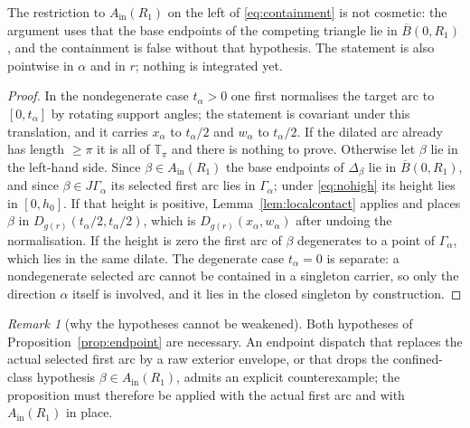 \documentclass[11pt]{article}
\theoremstyle{plain}
\theoremstyle{definition}
\theoremstyle{remark}
\newtheorem{remark}[theorem]{Remark}
\newcommand{\Tp}{\mathbb{T}_{\pi}}
\newcommand{\Ain}{A_{\mathrm{in}}}
\begin{document}
The restriction to $\Ain(R_{1})$ on the left of \eqref{eq:containment} is not
cosmetic: the argument uses that the base endpoints of the competing triangle lie
in $\overline B(0,R_{1})$, and the containment is false without that hypothesis.
The statement is also pointwise in $\alpha$ and in $r$; nothing is integrated
yet.

\begin{proof}
In the nondegenerate case $t_{\alpha}>0$ one first normalises the target arc to
$[0,t_{\alpha}]$ by rotating support angles; the statement is covariant under
this translation, and it carries $x_{\alpha}$ to $t_{\alpha}/2$ and
$w_{\alpha}$ to $t_{\alpha}/2$. If the dilated arc already has length $\ge\pi$
it is all of $\Tp$ and there is nothing to prove. Otherwise let $\beta$ lie in
the left-hand side. Since $\beta\in\Ain(R_{1})$ the base endpoints of
$\Delta_{\beta}$ lie in $\overline B(0,R_{1})$, and since
$\beta\in J\Gamma_{\alpha}$ its selected first arc lies in $\Gamma_{\alpha}$;
under \eqref{eq:nohigh} its height lies in $[0,h_{0}]$. If that height is
positive, Lemma~\ref{lem:localcontact} applies and places $\beta$ in
$D_{g(r)}(t_{\alpha}/2,t_{\alpha}/2)$, which is
$D_{g(r)}(x_{\alpha},w_{\alpha})$ after undoing the normalisation. If the height
is zero the first arc of $\beta$ degenerates to a point of $\Gamma_{\alpha}$,
which lies in the same dilate. The degenerate case $t_{\alpha}=0$ is separate: a
nondegenerate selected arc cannot be contained in a singleton carrier, so only
the direction $\alpha$ itself is involved, and it lies in the closed singleton by
construction.
\end{proof}

\begin{remark}[why the hypotheses cannot be weakened]\label{rem:counterexample}
Both hypotheses of Proposition~\ref{prop:endpoint} are necessary. An endpoint
dispatch that replaces the actual selected first arc by a raw exterior envelope,
or that drops the confined-class hypothesis $\beta\in\Ain(R_{1})$, admits an
explicit counterexample; the proposition must therefore be applied with the
actual first arc and with $\Ain(R_{1})$ in place.
\end{remark}
\end{document}
